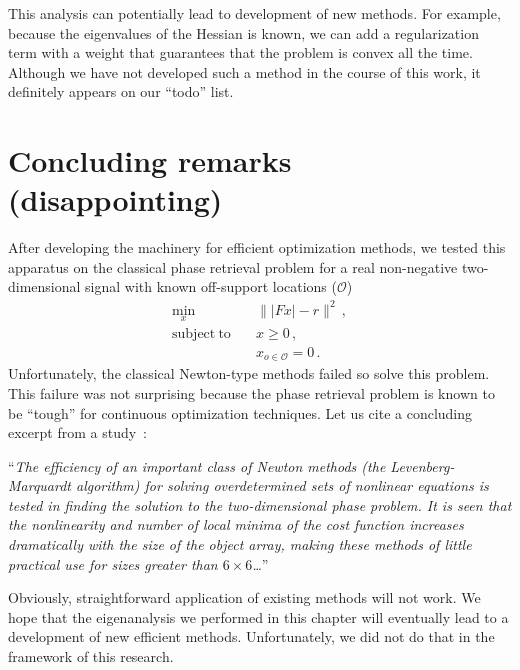 This analysis can potentially lead to development of new methods. For
example, because the eigenvalues of the Hessian is known, we can add a
regularization term with a weight that guarantees that the problem is
convex all the time. Although we have not developed such a method in
the course of this work, it definitely appears on our ``todo'' list.

\section{Concluding remarks (disappointing)}
\label{sec:concl-remarks-disapp}
After developing the machinery for efficient optimization methods, we
tested this apparatus on the classical phase retrieval problem for a
real non-negative two-dimensional signal with known off-support
locations ($\mathcal O$)
\begin{equation}
  \label{eq:85}
  \begin{split}
    \min_{x} & \quad \||Fx|-r\|^{2} \,, \\
    \mathrm{subject\ to} &\quad x \geq 0 \,, \\
    &\quad x_{o\in\mathcal O} = 0 \,. 
  \end{split}
\end{equation}
Unfortunately, the classical Newton-type methods failed so solve this
problem. This failure was not surprising because the phase retrieval
problem is known to be ``tough'' for continuous optimization
techniques. Let us cite a concluding excerpt from a
study~\cite{nieto-vesperinas86study}:

``\textit{The efficiency of an important class of Newton methods
(the Levenberg-Marquardt algorithm) for solving
overdetermined sets of nonlinear equations is tested in
finding the solution to the two-dimensional phase problem.
It is seen that the nonlinearity and number of local
minima of the cost function increases dramatically with
the size of the object array, making these methods of little
practical use for sizes greater than $6\times 6$\ldots}''

Obviously, straightforward application of existing methods will not
work. We hope that the eigenanalysis we performed in this chapter will
eventually lead to a development of new efficient methods. Unfortunately, we
did not do that in the framework of this research. 


